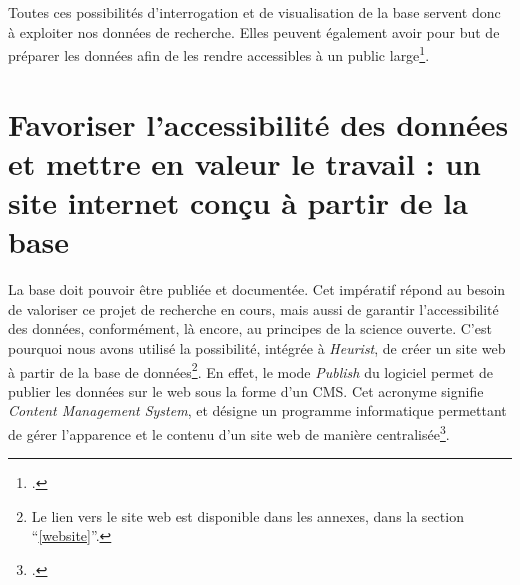 Toutes ces possibilités d'interrogation et de visualisation de la base servent donc à exploiter nos données de recherche. Elles peuvent également avoir pour but de préparer les données afin de les rendre accessibles à un public large\footcite[\enquote{Mettre en ligne les données gérées dans Heurist}]{paillusson_introduction_2022}. 

\section{Favoriser l'accessibilité des données et mettre en valeur le travail : un site internet conçu à partir de la base}

La base doit pouvoir être publiée et documentée. Cet impératif répond au besoin de valoriser ce projet de recherche en cours, mais aussi de garantir l'accessibilité des données, conformément, là encore, au principes de la science ouverte. C'est pourquoi nous avons utilisé la possibilité, intégrée à \emph{Heurist}, de créer un site web à partir de la base de données\footnote{Le lien vers le site web est disponible dans les annexes, dans la section \enquote{\ref{website}}.}. En effet, le mode \emph{Publish} du logiciel permet de publier les données sur le web sous la forme d'un CMS. Cet acronyme signifie \emph{Content Management System}, et désigne un programme informatique permettant de gérer l'apparence et le contenu d'un site web de manière centralisée\footcite{noauthor_content_nodate}. 

